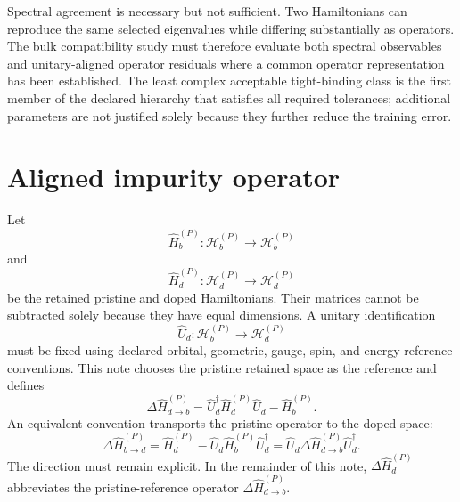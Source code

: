 Spectral agreement is necessary but not sufficient. Two Hamiltonians can
reproduce the same selected eigenvalues while differing substantially as
operators. The bulk compatibility study must therefore evaluate both spectral
observables and unitary-aligned operator residuals where a common operator
representation has been established. The least complex acceptable
tight-binding class is the first member of the declared hierarchy that
satisfies all required tolerances; additional parameters are not justified
solely because they further reduce the training error.

\section*{Aligned impurity operator}

Let
\begin{equation}
    \hat H_b^{(P)}:
    \mathcal H_b^{(P)}
    \longrightarrow
    \mathcal H_b^{(P)}
\end{equation}
and
\begin{equation}
    \hat H_d^{(P)}:
    \mathcal H_d^{(P)}
    \longrightarrow
    \mathcal H_d^{(P)}
\end{equation}
be the retained pristine and doped Hamiltonians. Their matrices cannot be
subtracted solely because they have equal dimensions. A unitary identification
\begin{equation}
    \hat U_d:
    \mathcal H_b^{(P)}
    \longrightarrow
    \mathcal H_d^{(P)}
\end{equation}
must be fixed using declared orbital, geometric, gauge, spin, and
energy-reference conventions. This note chooses the pristine retained space as the reference and defines
\begin{equation}
    \Delta\hat H_{d\rightarrow b}^{(P)}
    =
    \hat U_d^\dagger
    \hat H_d^{(P)}
    \hat U_d
    -
    \hat H_b^{(P)}.
\end{equation}
An equivalent convention transports the pristine operator to the doped space:
\begin{equation}
    \Delta\hat H_{b\rightarrow d}^{(P)}
    =
    \hat H_d^{(P)}
    -
    \hat U_d
    \hat H_b^{(P)}
    \hat U_d^\dagger
    =
    \hat U_d
    \Delta\hat H_{d\rightarrow b}^{(P)}
    \hat U_d^\dagger.
\end{equation}
The direction must remain explicit. In the remainder of this note,
$\Delta\hat H_d^{(P)}$ abbreviates the pristine-reference operator
$\Delta\hat H_{d\rightarrow b}^{(P)}$.

